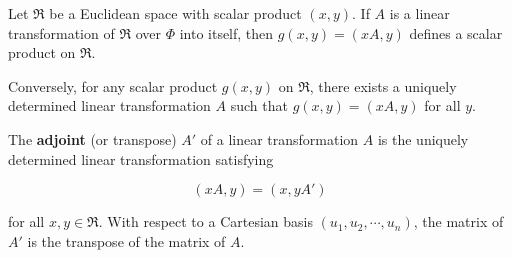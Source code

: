 Let $\Re$ be a Euclidean space with scalar product $(x, y)$. If $A$ is a linear transformation of $\Re$ over $\Phi$ into itself, then $g(x, y) = (xA, y)$ defines a scalar product on $\Re$.

Conversely, for any scalar product $g(x, y)$ on $\Re$, there exists a uniquely determined linear transformation $A$ such that $g(x, y) = (xA, y)$ for all $y$.

The \textbf{adjoint} (or transpose) $A'$ of a linear transformation $A$ is the uniquely determined linear transformation satisfying

$$(xA, y) = (x, yA')$$

for all $x, y \in \Re$. With respect to a Cartesian basis $(u_1, u_2, \cdots, u_n)$, the matrix of $A'$ is the transpose of the matrix of $A$.

